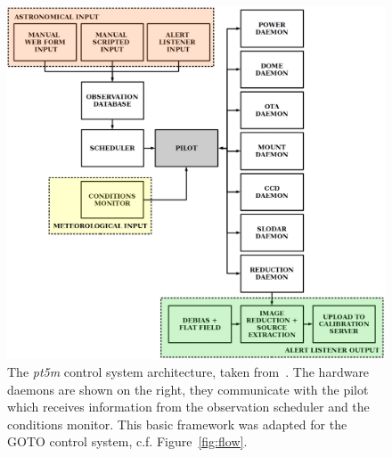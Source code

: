 \begin{colsection}
\begin{colsection}
\begin{figure}[p]
\begin{center}
\includegraphics[width=\linewidth]{images/pt5m_software.png}
\end{center}
\caption[\textit{pt5m} control system architecture]{The \textit{pt5m} control system architecture, taken from~\cite{pt5m}. The hardware daemons are shown on the right, they communicate with the pilot which receives information from the observation scheduler and the conditions monitor. This basic framework was adapted for the GOTO control system, c.f. Figure~\ref{fig:flow}.}
\label{fig:pt5m_software}
\end{figure}

\end{colsection}


\end{colsection}


\newpage
